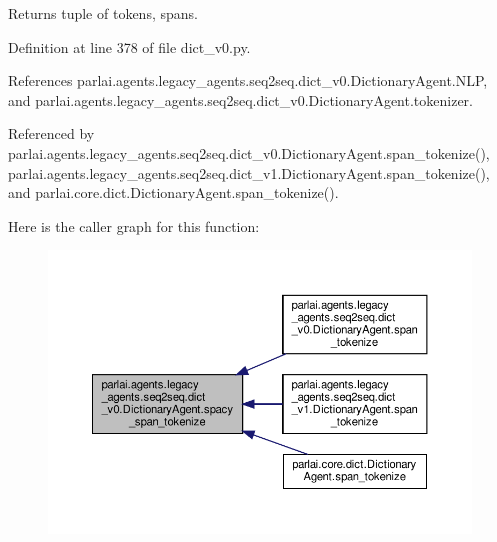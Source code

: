 \begin{DoxyVerb}Returns tuple of tokens, spans.\end{DoxyVerb}
 

Definition at line 378 of file dict\+\_\+v0.\+py.



References parlai.\+agents.\+legacy\+\_\+agents.\+seq2seq.\+dict\+\_\+v0.\+Dictionary\+Agent.\+N\+LP, and parlai.\+agents.\+legacy\+\_\+agents.\+seq2seq.\+dict\+\_\+v0.\+Dictionary\+Agent.\+tokenizer.



Referenced by parlai.\+agents.\+legacy\+\_\+agents.\+seq2seq.\+dict\+\_\+v0.\+Dictionary\+Agent.\+span\+\_\+tokenize(), parlai.\+agents.\+legacy\+\_\+agents.\+seq2seq.\+dict\+\_\+v1.\+Dictionary\+Agent.\+span\+\_\+tokenize(), and parlai.\+core.\+dict.\+Dictionary\+Agent.\+span\+\_\+tokenize().

Here is the caller graph for this function\+:
\nopagebreak
\begin{figure}[H]
\begin{center}
\leavevmode
\includegraphics[width=350pt]{classparlai_1_1agents_1_1legacy__agents_1_1seq2seq_1_1dict__v0_1_1DictionaryAgent_a9e091c9b3daf9f5e7496f7aac6f473eb_icgraph}
\end{center}
\end{figure}
\mbox{\label{classparlai_1_1agents_1_1legacy__agents_1_1seq2seq_1_1dict__v0_1_1DictionaryAgent_a1064af1b19fec27e689ccd414e450e06}} 
